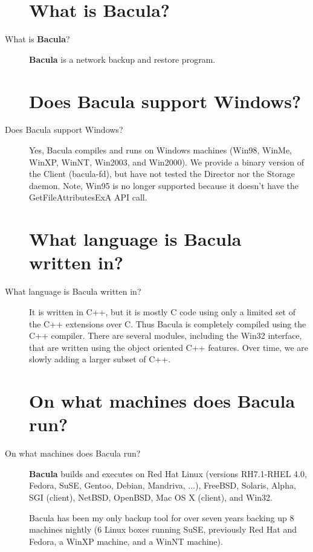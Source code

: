 \begin{description}
\label{what}
\section{What is Bacula?}
\item [What is {\bf Bacula}? ]
   {\bf Bacula} is a network backup and restore program.

\section{Does Bacula support Windows?}
\item [Does Bacula support Windows?]
   Yes, Bacula compiles and runs on Windows machines (Win98, WinMe, WinXP,
   WinNT, Win2003, and Win2000).  We provide a binary version of the Client
   (bacula-fd), but have not tested the Director nor the Storage daemon.
   Note, Win95 is no longer supported because it doesn't have the
   GetFileAttributesExA API call.


\label{lang}
\section{What language is Bacula written in?}
\item [What language is Bacula written in?]
   It is written in C++, but it is mostly C  code using only a limited set of
   the C++ extensions  over C.  Thus Bacula is completely  compiled using the
   C++ compiler. There are several modules, including the Win32 interface, that
   are written using the  object oriented C++ features. Over time, we are slowly
   adding a larger  subset of C++.

\label{run}
\section{On what machines does Bacula run?}
\item [On what machines does Bacula run? ]
   {\bf Bacula} builds and executes on Red Hat Linux (versions RH7.1-RHEL
   4.0, Fedora, SuSE, Gentoo, Debian, Mandriva, ...), FreeBSD, Solaris,
   Alpha, SGI (client), NetBSD, OpenBSD, Mac OS X (client), and Win32.

   Bacula has been my only backup tool for over seven years backing up 8
   machines nightly (6 Linux boxes running SuSE, previously
   Red Hat and Fedora, a WinXP machine, and a WinNT machine).



\end{description}
